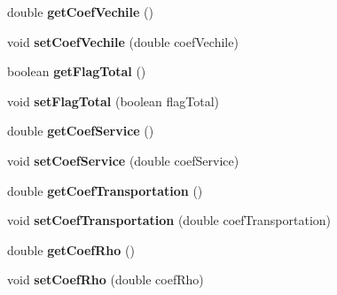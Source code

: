 \begin{DoxyCompactItemize}
\item 
double {\bfseries get\+Coef\+Vechile} ()\hypertarget{classsvrptw_1_1_parameters_af3ce7089d7b7a50f8e89fc3fa63cd525}{}\label{classsvrptw_1_1_parameters_af3ce7089d7b7a50f8e89fc3fa63cd525}

\item 
void {\bfseries set\+Coef\+Vechile} (double coef\+Vechile)\hypertarget{classsvrptw_1_1_parameters_abf71590a676569ae65f5b370049249a4}{}\label{classsvrptw_1_1_parameters_abf71590a676569ae65f5b370049249a4}

\item 
boolean {\bfseries get\+Flag\+Total} ()\hypertarget{classsvrptw_1_1_parameters_a68b85a6ea782f8130470754813f075f2}{}\label{classsvrptw_1_1_parameters_a68b85a6ea782f8130470754813f075f2}

\item 
void {\bfseries set\+Flag\+Total} (boolean flag\+Total)\hypertarget{classsvrptw_1_1_parameters_a2e5080c87bdc11a407e92caf6d6f52fe}{}\label{classsvrptw_1_1_parameters_a2e5080c87bdc11a407e92caf6d6f52fe}

\item 
double {\bfseries get\+Coef\+Service} ()\hypertarget{classsvrptw_1_1_parameters_a1f55c2a71832fe3cb9057ea22792805f}{}\label{classsvrptw_1_1_parameters_a1f55c2a71832fe3cb9057ea22792805f}

\item 
void {\bfseries set\+Coef\+Service} (double coef\+Service)\hypertarget{classsvrptw_1_1_parameters_a4c4feb24baf686e7bf2904e496e5f1e5}{}\label{classsvrptw_1_1_parameters_a4c4feb24baf686e7bf2904e496e5f1e5}

\item 
double {\bfseries get\+Coef\+Transportation} ()\hypertarget{classsvrptw_1_1_parameters_ac7f355c86fb6e9be155859838d7087e0}{}\label{classsvrptw_1_1_parameters_ac7f355c86fb6e9be155859838d7087e0}

\item 
void {\bfseries set\+Coef\+Transportation} (double coef\+Transportation)\hypertarget{classsvrptw_1_1_parameters_a6441effe82ba0601cc67449eaccd78a1}{}\label{classsvrptw_1_1_parameters_a6441effe82ba0601cc67449eaccd78a1}

\item 
double {\bfseries get\+Coef\+Rho} ()\hypertarget{classsvrptw_1_1_parameters_ae5274f0af036ef3a7808b38358d6aa01}{}\label{classsvrptw_1_1_parameters_ae5274f0af036ef3a7808b38358d6aa01}

\item 
void {\bfseries set\+Coef\+Rho} (double coef\+Rho)\hypertarget{classsvrptw_1_1_parameters_addc6be7a2905825eac929a54646c3f20}{}\label{classsvrptw_1_1_parameters_addc6be7a2905825eac929a54646c3f20}


\end{DoxyCompactItemize}
